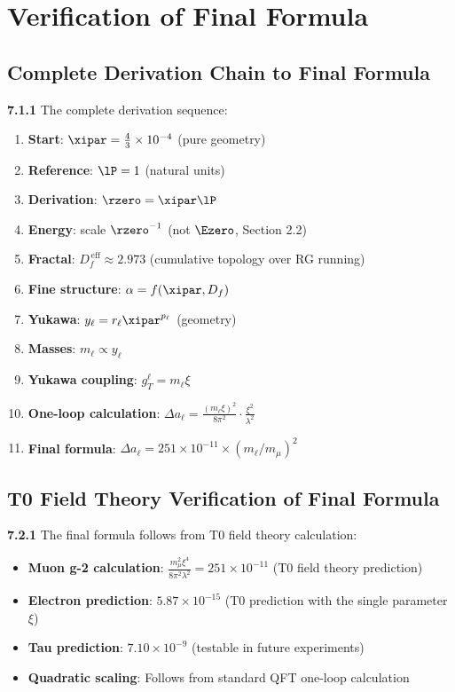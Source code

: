 	\section{Verification of Final Formula}
	
	\subsection{Complete Derivation Chain to Final Formula}
	
	\noindent \textbf{7.1.1} The complete derivation sequence:
	\begin{enumerate}
		\item \textbf{Start}: $\xipar = \frac{4}{3} \times 10^{-4}$ (pure geometry)
		\item \textbf{Reference}: $\lP = 1$ (natural units)
		\item \textbf{Derivation}: $\rzero = \xipar \lP$
		\item \textbf{Energy}: scale $\rzero^{-1}$ (not $\Ezero$, Section 2.2)
		\item \textbf{Fractal}: $D_f^{\,\text{eff}} \approx 2.973$ (cumulative topology over RG running)
		\item \textbf{Fine structure}: $\alpha = f(\xipar, D_f)$
		\item \textbf{Yukawa}: $y_\ell = r_\ell \xipar^{p_\ell}$ (geometry)
		\item \textbf{Masses}: $m_\ell \propto y_\ell$
		\item \textbf{Yukawa coupling}: $g_T^\ell = m_\ell \xi$
		\item \textbf{One-loop calculation}: $\Delta a_\ell = \frac{(m_\ell \xi)^2}{8\pi^2} \cdot \frac{\xi^2}{\lambda^2}$
		\item \textbf{Final formula}: $\Delta a_\ell = 251 \times 10^{-11} \times (m_\ell/m_\mu)^2$
	\end{enumerate}
	
	\subsection{T0 Field Theory Verification of Final Formula}
	
	\noindent \textbf{7.2.1} The final formula follows from T0 field theory calculation:
	\begin{itemize}
		\item \textbf{Muon g-2 calculation}: $\frac{m_\mu^2 \xi^4}{8\pi^2 \lambda^2} = 251 \times 10^{-11}$ (T0 field theory prediction)
		\item \textbf{Electron prediction}: $5.87 \times 10^{-15}$ (T0 prediction with the single parameter $\xi$)
		\item \textbf{Tau prediction}: $7.10 \times 10^{-9}$ (testable in future experiments)
		\item \textbf{Quadratic scaling}: Follows from standard QFT one-loop calculation
	\end{itemize}
	
